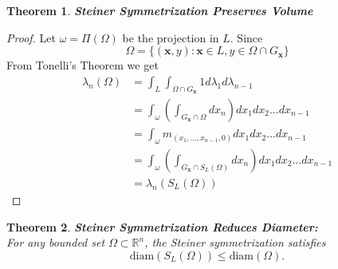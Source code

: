 \documentclass{article}
\theoremstyle{plain}
\newtheorem{thm}{Theorem}[section]
\theoremstyle{definition}
\theoremstyle{remark}
\begin{document}
\begin{thm}\label{thm:steiner-vol}{\textbf{Steiner Symmetrization Preserves Volume}}
\end{thm}
\begin{proof}
    Let $\omega = \Pi (\Omega )$ be the projection in $L$. Since \[
    \Omega  = \{(\mathbf{x}, y): \mathbf{x} \in L, y \in \Omega \cap G_{\mathbf{x}}\}
    \]From Tonelli's Theorem we get
    \begin{align*}
        \lambda_n(\Omega ) & = \int _L \int _{\Omega \cap G_\mathbf{x}}1d\lambda _1 d\lambda _{n-1}\\ & = \int _{\omega } \left ( \int _{G_\mathbf{x} \cap \Omega }dx_n \right ) dx_1dx_2...dx_{n-1} \\ & = \int _{ \omega } m_{(x_1,...,x_{n-1},0)}dx_1dx_2...dx_{n-1} \\ & = \int _{\omega } \left ( \int _{ G_\mathbf{x} \cap S_L(\Omega)} dx_n\right )dx_1dx_2...dx_{n-1} \\ & = \lambda_n(S_L(\Omega ))
    \end{align*}
\end{proof}

\begin{thm}\label{thm:steiner-diam} \textbf{Steiner Symmetrization Reduces Diameter:}~\\
For any bounded set $\Omega \subset \mathbb{R}^n$, the Steiner symmetrization
satisfies
\[
\mathrm{diam}(S_L(\Omega)) \leq \mathrm{diam}(\Omega).
\]
\end{thm}
\end{document}
